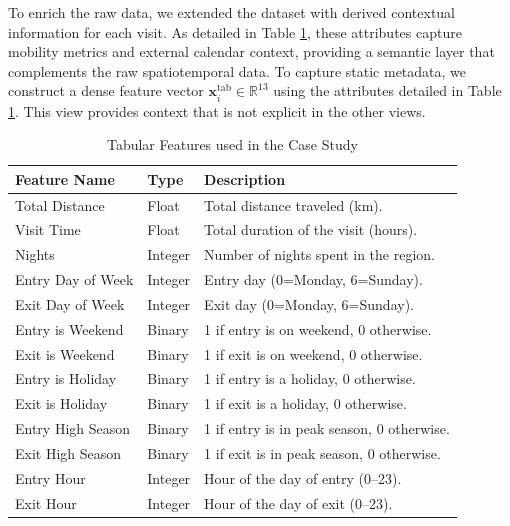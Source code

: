 \documentclass[journal]{IEEEtran}
\begin{document}
To enrich the raw data, we extended the dataset with derived contextual information for each visit. As detailed in Table \ref{tab:features_desc}, these attributes capture mobility metrics and external calendar context, providing a semantic layer that complements the raw spatiotemporal data. To capture static metadata, we construct a dense feature vector $\mathbf{x}_i^{\text{tab}} \in \mathbb{R}^{13}$ using the attributes detailed in Table \ref{tab:features_desc}. This view provides context that is not explicit in the other views.


\begin{table}[H]
    \centering
    \caption{Tabular Features used in the Case Study}
    \label{tab:features_desc}
    \footnotesize 
    \renewcommand{\arraystretch}{1.25} 
    \begin{tabularx}{0.97\linewidth}{@{}l l X@{}} 
    \toprule
    \textbf{Feature Name} & \textbf{Type} & \textbf{Description} \\
    \midrule
    Total Distance & Float & Total distance traveled (km). \\
    Visit Time & Float & Total duration of the visit (hours). \\
    Nights & Integer & Number of nights spent in the region. \\
    Entry Day of Week & Integer & Entry day (0=Monday, 6=Sunday). \\
    Exit Day of Week & Integer & Exit day (0=Monday, 6=Sunday). \\
    Entry is Weekend & Binary & 1 if entry is on weekend, 0 otherwise. \\
    Exit is Weekend & Binary & 1 if exit is on weekend, 0 otherwise. \\
    Entry is Holiday & Binary & 1 if entry is a holiday, 0 otherwise. \\
    Exit is Holiday & Binary & 1 if exit is a holiday, 0 otherwise. \\
    Entry High Season & Binary & 1 if entry is in peak season, 0 otherwise. \\
    Exit High Season & Binary & 1 if exit is in peak season, 0 otherwise. \\
    Entry Hour & Integer & Hour of the day of entry (0--23). \\
    Exit Hour & Integer & Hour of the day of exit (0--23). \\
    \bottomrule
    \end{tabularx}
\end{table}
\end{document}
